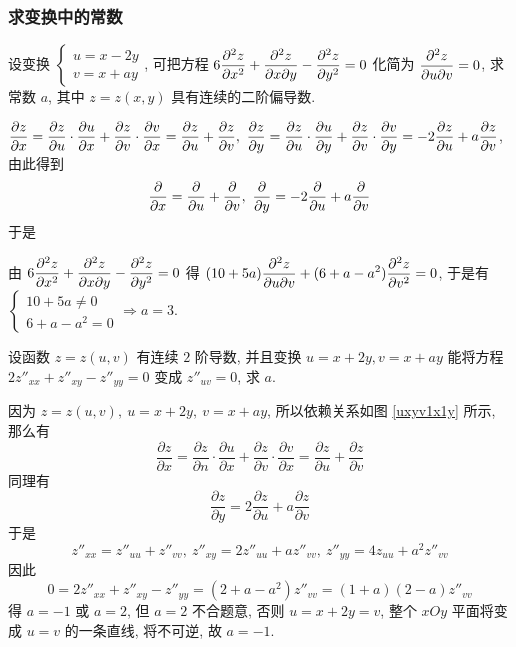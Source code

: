 \subsubsection{求变换中的常数}

\begin{example}
    设变换 $\displaystyle\begin{cases}
            u=x-2y \\
            v=x+ay
        \end{cases}$, 可把方程 $\displaystyle 6\pdv[2]{z}{x}+\pdv{z}{x}{y}-\pdv[2]{z}{y}=0$ 化简为 $\displaystyle\pdv{z}{u}{v}=0$, 求常数 $a$, 其中 $z=z(x,y)$ 具有连续的二阶偏导数.
\end{example}
\begin{solution}
    $\displaystyle \pdv{z}{x}=\pdv{z}{u}\cdot\pdv{u}{x}+\pdv{z}{v}\cdot\pdv{v}{x}=\pdv{z}{u}+\pdv{z}{v},~\pdv{z}{y}=\pdv{z}{u}\cdot\pdv{u}{y}+\pdv{z}{v}\cdot\pdv{v}{y}=-2\pdv{z}{u}+a\pdv{z}{v}$, 由此得到
    $$\pdv{x}=\pdv{u}+\pdv{v},~\pdv{y}=-2\pdv{u}+a\pdv{v}$$
    于是
    由 $\displaystyle 6\pdv[2]{z}{x}+\pdv{z}{x}{y}-\pdv[2]{z}{y}=0$ 得 $\displaystyle(10+5a)\pdv{z}{u}{v}+(6+a-a^2)\pdv[2]{z}{v}=0$, 于是有
    $\displaystyle\begin{cases}
            10+5a\neq0 \\
            6+a-a^2=0
        \end{cases}\Rightarrow a=3.$
\end{solution}

\begin{example}
    设函数 $z=z(u,v)$ 有连续 $2$ 阶导数, 并且变换 $u=x+2y,v=x+ay$ 能将方程 $2z''_{xx}+z''_{xy}-z''_{yy}=0$ 变成 $z''_{uv}=0$, 求 $a$.
\end{example}
\begin{solution}
    因为 $z=z(u,v),~u=x+2y,~v=x+ay$, 所以依赖关系如图 \ref{uxyv1x1y} 所示, 那么有
    $$\displaystyle\frac{\partial z}{\partial x}=\frac{\partial z}{\partial n}\cdot\frac{\partial u}{\partial x}+\frac{\partial z}{\partial v}\cdot\frac{\partial v}{\partial x}=\frac{\partial z}{\partial u}+\frac{\partial z}{\partial v}$$
    同理有 $$\displaystyle\frac{\partial z}{\partial y}=2\frac{\partial z}{\partial u}+a\frac{\partial z}{\partial v}$$
    于是 $$z''_{xx}=z''_{uu}+z''_{vv},~z''_{xy}=2z''_{uu}+az''_{vv},~z''_{yy}=4z_{uu}+a^2z''_{vv}$$
    因此 $$0=2z''_{xx}+z''_{xy}-z''_{yy}=(2+a-a^2)z''_{vv}=(1+a)(2-a)z''_{vv}$$
    得 $a=-1\text{ 或 }a=2$, 但 $a=2$ 不合题意, 否则 $u=x+2y=v$, 整个 $xOy$ 平面将变成 $u=v$ 的一条直线, 将不可逆, 故 $a=-1.$
\end{solution}

